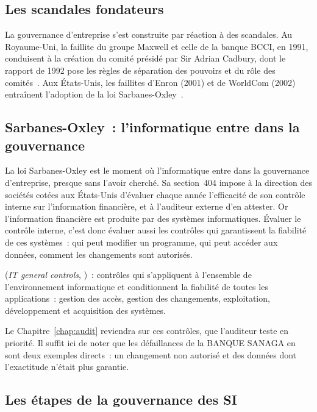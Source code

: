 \subsection{Les scandales fondateurs}

La gouvernance d'entreprise s'est construite par réaction à des scandales.
Au Royaume-Uni, la faillite du groupe Maxwell et celle de la banque BCCI,
en 1991, conduisent à la création du comité présidé par Sir Adrian
Cadbury, dont le rapport de 1992 pose les règles de séparation des
pouvoirs et du rôle des comités~\cite{cadbury1992}. Aux États-Unis, les
faillites d'Enron (2001) et de WorldCom (2002) entraînent l'adoption de la
loi Sarbanes-Oxley~\cite{sox2002}.

\subsection{Sarbanes-Oxley~: l'informatique entre dans la gouvernance}

La loi Sarbanes-Oxley est le moment où l'informatique entre dans la
gouvernance d'entreprise, presque sans l'avoir cherché. Sa section~404
impose à la direction des sociétés cotées aux États-Unis d'évaluer chaque
année l'efficacité de son contrôle interne sur l'information financière,
et à l'auditeur externe d'en attester. Or l'information financière est
produite par des systèmes informatiques. Évaluer le contrôle interne,
c'est donc évaluer aussi les contrôles qui garantissent la fiabilité de
ces systèmes~: qui peut modifier un programme, qui peut accéder aux
données, comment les changements sont autorisés.

\begin{boxdef}
 (\textit{IT general controls}, )~: contrôles qui
s'appliquent à l'ensemble de l'environnement informatique et conditionnent
la fiabilité de toutes les applications~: gestion des accès, gestion des
changements, exploitation, développement et acquisition des systèmes.
\end{boxdef}

Le Chapitre~\ref{chap:audit} reviendra sur ces contrôles, que l'auditeur
teste en priorité. Il suffit ici de noter que les défaillances de la
BANQUE SANAGA en sont deux exemples directs~: un changement non autorisé
et des données dont l'exactitude n'était plus garantie.

\subsection{Les étapes de la gouvernance des SI}

